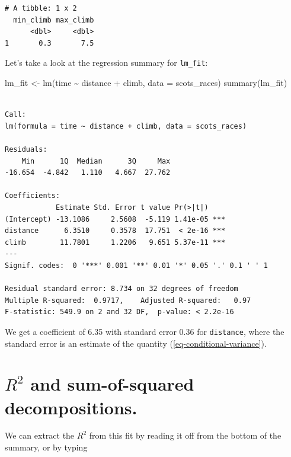 \documentclass[
  11pt,
  letterpaper,
  oneside]{book}
\newenvironment{Shaded}{\begin{snugshade}}{\end{snugshade}}
\newcommand{\AttributeTok}[1]{\textcolor[rgb]{0.40,0.45,0.13}{#1}}
\newcommand{\FunctionTok}[1]{\textcolor[rgb]{0.28,0.35,0.67}{#1}}
\newcommand{\NormalTok}[1]{\textcolor[rgb]{0.00,0.23,0.31}{#1}}
\newcommand{\OtherTok}[1]{\textcolor[rgb]{0.00,0.23,0.31}{#1}}
\newcommand{\SpecialCharTok}[1]{\textcolor[rgb]{0.37,0.37,0.37}{#1}}
\theoremstyle{plain}
\theoremstyle{plain}
\theoremstyle{definition}
\theoremstyle{definition}
\theoremstyle{plain}
\theoremstyle{remark}
\begin{document}
\begin{verbatim}
# A tibble: 1 x 2
  min_climb max_climb
      <dbl>     <dbl>
1       0.3       7.5
\end{verbatim}

Let's take a look at the regression summary for \texttt{lm\_fit}:

\begin{Shaded}
\begin{Highlighting}[]
\NormalTok{lm\_fit }\OtherTok{\textless{}{-}} \FunctionTok{lm}\NormalTok{(time }\SpecialCharTok{\textasciitilde{}}\NormalTok{ distance }\SpecialCharTok{+}\NormalTok{ climb, }\AttributeTok{data =}\NormalTok{ scots\_races)}
\FunctionTok{summary}\NormalTok{(lm\_fit)}
\end{Highlighting}
\end{Shaded}

\begin{verbatim}

Call:
lm(formula = time ~ distance + climb, data = scots_races)

Residuals:
    Min      1Q  Median      3Q     Max 
-16.654  -4.842   1.110   4.667  27.762 

Coefficients:
            Estimate Std. Error t value Pr(>|t|)    
(Intercept) -13.1086     2.5608  -5.119 1.41e-05 ***
distance      6.3510     0.3578  17.751  < 2e-16 ***
climb        11.7801     1.2206   9.651 5.37e-11 ***
---
Signif. codes:  0 '***' 0.001 '**' 0.01 '*' 0.05 '.' 0.1 ' ' 1

Residual standard error: 8.734 on 32 degrees of freedom
Multiple R-squared:  0.9717,    Adjusted R-squared:   0.97 
F-statistic: 549.9 on 2 and 32 DF,  p-value: < 2.2e-16
\end{verbatim}

We get a coefficient of 6.35 with standard error 0.36 for
\texttt{distance}, where the standard error is an estimate of the
quantity (\ref{eq-conditional-variance}).

\hypertarget{r2-and-sum-of-squared-decompositions.}{%
\section{\texorpdfstring{\(R^2\) and sum-of-squared
decompositions.}{R\^{}2 and sum-of-squared decompositions.}}\label{r2-and-sum-of-squared-decompositions.}}

We can extract the \(R^2\) from this fit by reading it off from the
bottom of the summary, or by typing

\begin{Shaded}
\end{Shaded}
\end{document}
